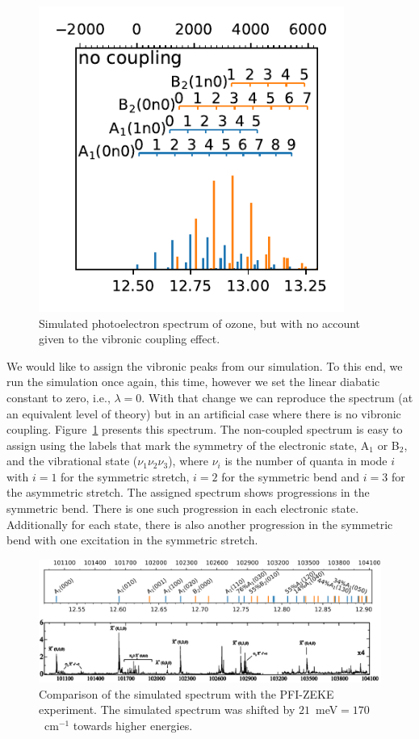 \documentclass[12pt,a4paper,prb,aps,superscriptaddress]{revtex4}
\begin{document}
\begin{figure}
    \includegraphics[width=10cm]{figures/spectrum_assigned.pdf}
    \caption{
        Simulated photoelectron spectrum of ozone, but with no account given
        to the vibronic coupling effect.
    }
    \label{fig:no_coupling}
\end{figure}

We would like to assign the vibronic peaks from our simulation. To this end,
we run the simulation once again, this time, however we set the linear
diabatic constant to zero, i.e., $\lambda = 0$. With that change we can
reproduce the spectrum (at an equivalent level of theory) but in an artificial
case where there is no vibronic coupling. Figure~\ref{fig:no_coupling}
presents this spectrum. The non-coupled spectrum is easy to assign using the
labels that mark the symmetry of the electronic state, A$_1$ or B$_2$, and the
vibrational state ($\nu _1 \nu_2 \nu_3$), where $\nu _i$ is the number of
quanta in mode $i$ with $i=1$ for the symmetric stretch, $i=2$ for the
symmetric bend and $i=3$ for the asymmetric stretch. The assigned spectrum
shows progressions in the symmetric bend. There is one such progression in
each electronic state.  Additionally for each state, there is also another
progression in the symmetric bend with one excitation in the symmetric
stretch.

\begin{figure}
    \includegraphics[width=16 cm]{./figures/sim_vs_zeke}
    \caption{
        Comparison of the simulated spectrum with the PFI-ZEKE
        experiment.\cite{Willitsch:O3ZEKE:2005} The simulated spectrum was
        shifted by $21$~meV$ = 170$~cm$^{-1}$ towards higher energies.
    }
    \label{fig:sim_vs_zeke}
\end{figure}
\end{document}
